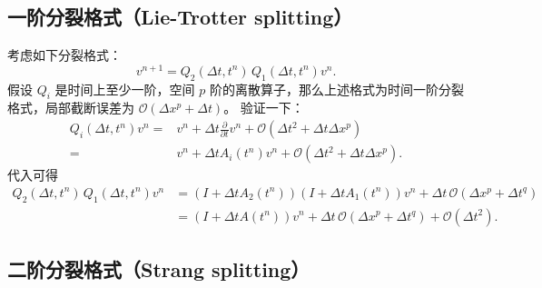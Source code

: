 \subsection{一阶分裂格式（Lie-Trotter splitting）}

考虑如下分裂格式：
\[
    v^{n+1} =  Q_2(\Delta t,t^n)\, Q_1(\Delta t,t^n) v^n.
\]
假设 $Q_i$ 是时间上至少一阶，空间 $p$ 阶的离散算子，那么上述格式为时间一阶分裂格式，局部截断误差为 $\mathcal{O}(\Delta x^p + \Delta t)$。
验证一下：
\begin{align*}
    Q_i(\Delta t,t^n)v^n
    ={} & v^n  + \Delta t \frac{\partial}{\partial t}v^n  + \mathcal{O}(\Delta t^2 + \Delta t \Delta x^p) \\
    ={} & v^n  + \Delta t A_i(t^n)v^n  + \mathcal{O}(\Delta t^2 + \Delta t \Delta x^p).
\end{align*}
代入可得
\begin{align*}
    Q_2(\Delta t,t^n)\, Q_1(\Delta t,t^n) v^n
     & = (I + \Delta t A_2(t^n)) (I + \Delta t A_1(t^n)) v^n + \Delta t\, \mathcal{O}(\Delta x^p + \Delta t^q) \\
     & = (I + \Delta t A(t^n)) v^n + \Delta t\, \mathcal{O}(\Delta x^p + \Delta t^q) + \mathcal{O}(\Delta t^2).
\end{align*}

\subsection{二阶分裂格式（Strang splitting）}


